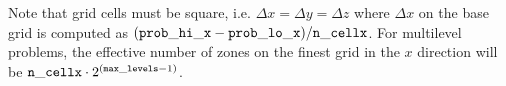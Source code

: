 Note that grid cells must be square, i.e. $\Delta x = \Delta y = \Delta z$
where $\Delta x$ on the base grid is computed as $({\tt prob\_hi\_x}
- {\tt prob\_lo\_x})/{\tt n\_cellx}$.  For multilevel problems, the effective
number of zones on the finest grid in the $x$ direction will be
${\tt n\_cellx} \cdot 2^{({\tt max\_levels} -1)}$.



